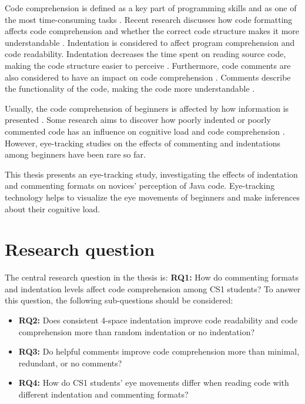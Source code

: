 Code comprehension is defined as a key part of programming skills and as one of the most time-consuming tasks \cite{javier2021understanding}.
Recent research discusses how code formatting affects code comprehension and whether the correct code structure makes it more understandable \cite{andrzejewska2020development}. Indentation is considered to affect program comprehension and code readability. Indentation decreases the time spent on reading source code, making the code structure easier to perceive \cite{bauer2017indentations}. Furthermore, code comments are also considered to have an impact on code comprehension \cite{bakhuizen2019comments}. Comments describe the functionality of the code, making the code more understandable \cite{bakhuizen2019comments}.
 
Usually, the code comprehension of beginners is affected by how information is presented \cite{robins2003learning}. Some research aims to discover how poorly indented or poorly commented code has an influence on cognitive load and code comprehension \cite{bauer2017indentations} \cite{yorimoto2024quantitative}.  However, eye-tracking studies on the effects of commenting and indentations among beginners have been rare so far. 

  
This thesis presents an eye-tracking study, investigating the effects of indentation and commenting formats on novices’ perception of Java code. Eye-tracking technology helps to visualize the eye movements of beginners and make inferences about their cognitive load. 


\section{Research question}

The central research question in the thesis is: \textbf{RQ1:} How do commenting formats and indentation levels affect code comprehension among CS1 students? To answer this question, the following sub-questions should be considered:

\begin{itemize}
    \item \textbf{RQ2:} Does consistent 4-space indentation improve code readability and code comprehension more than random indentation or no indentation? 
    \item \textbf{RQ3:} Do helpful comments improve code comprehension more than minimal, redundant, or no comments?
    \item \textbf{RQ4:} How do CS1 students’ eye movements differ when reading code with different indentation and commenting formats?

\end{itemize}

